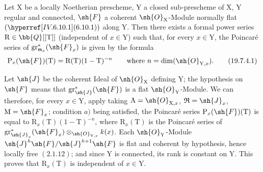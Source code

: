 \begin{corollary}[19.7.4]
\label{IV.19.7.4}
Let $\mathrm{X}$ be a locally Noetherian prescheme, $\mathrm{Y}$ a closed sub-prescheme of $\mathrm{X}$, $\mathrm{Y}$ regular and connected, $\sh{F}$ a coherent $\sh{O}_\mathrm{X}$-Module normally flat $(\sref{IV.6.10.1})$ along $\mathrm{Y}$. Then there exists a formal power series $\mathrm{R}\in\bb{Q}[[\mathrm{T}]]$ (independent of $x\in\mathrm{Y}$) such that, for every $x\in\mathrm{Y}$, the Poincar\'e series of $\operatorname{gr}_{\mathfrak{m}_x}^*(\sh{F}_x)$ is given by the formula
\begin{equation}
  \mathrm{P}_x(\sh{F})(\mathrm{T})=\mathrm{R}(\mathrm{T})(1-\mathrm{T})^{-n}\qquad\text{where }n=\dim(\sh{O}_{\mathrm{Y},x}).
  \label{IV.19.7.4.1}
\tag{19.7.4.1}
\end{equation}

Let $\sh{J}$ be the coherent Ideal of $\sh{O}_\mathrm{X}$ defining $\mathrm{Y}$; the hypothesis on $\sh{F}$ means that $\operatorname{gr}_\sh{J}^*(\sh{F})$ is a flat $\sh{O}_\mathrm{Y}$-Module. We can therefore, for every $x\in\mathrm{Y}$, apply  taking $\mathrm{A}=\sh{O}_{\mathrm{X},x}$, $\mathfrak{R}=\sh{J}_x$, $\mathrm{M}=\sh{F}_x$; condition $a)$ being satisfied, the Poincar\'e series $\mathrm{P}_x(\sh{F})(\mathrm{T})$ is equal to $\mathrm{R}_x(\mathrm{T})(1-\mathrm{T})^{-n}$, where $\mathrm{R}_x(\mathrm{T})$ is the Poincar\'e series of $\operatorname{gr}_{\sh{J}_x}^*(\sh{F}_x)\otimes_{\sh{O}_{\mathrm{Y},x}}k(x)$. Each $\sh{O}_\mathrm{Y}$-Module $\sh{J}^h\sh{F}/\sh{J}^{h+1}\sh{F}$ is flat and coherent by hypothesis, hence locally free $(2.1.12)$; and since $\mathrm{Y}$ is connected, its rank is constant on $\mathrm{Y}$. This proves that $\mathrm{R}_x(\mathrm{T})$ is independent of $x\in\mathrm{Y}$.
\end{corollary}

